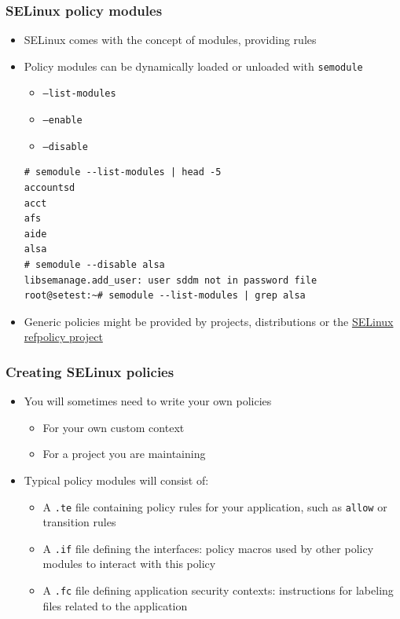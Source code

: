 \begin{frame}[fragile]
	\frametitle{SELinux policy modules}
	\begin{itemize}
		\item SELinux comes with the concept of modules, providing rules
		\item Policy modules can be dynamically loaded or unloaded with
			\texttt{semodule}
			\begin{itemize}
				\item \texttt{--list-modules}
				\item \texttt{--enable}
				\item \texttt{--disable}
			\end{itemize}
			\begin{block}{}
				{\tiny
				\begin{verbatim}
# semodule --list-modules | head -5
accountsd
acct
afs
aide
alsa
# semodule --disable alsa
libsemanage.add_user: user sddm not in password file
root@setest:~# semodule --list-modules | grep alsa
\end{verbatim}
}
			\end{block}
		\item Generic policies might be provided by projects, distributions or the
			\href{https://github.com/SELinuxProject/refpolicy}{SELinux refpolicy
			project}
	\end{itemize}
\end{frame}

\begin{frame}
	\frametitle{Creating SELinux policies}
	\begin{itemize}
		\item You will sometimes need to write your own policies
			\begin{itemize}
				\item For your own custom context
				\item For a project you are maintaining
			\end{itemize}
		\item Typical policy modules will consist of:
			\begin{itemize}
				\item A \texttt{.te} file containing policy rules for your application,
					such as \texttt{allow} or transition rules
				\item A \texttt{.if} file defining the interfaces: policy macros used by
					other policy modules to interact with this policy
				\item A \texttt{.fc} file defining application security contexts:
					instructions for labeling files related to the application
			\end{itemize}
	\end{itemize}
\end{frame}

